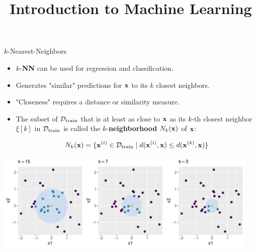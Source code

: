 \documentclass[11pt,compress,t,notes=noshow, xcolor=table]{beamer}
\title{Introduction to Machine Learning}
\institute{\href{https://compstat-lmu.github.io/lecture_i2ml/}{compstat-lmu.github.io/lecture\_i2ml}}
\date{}
\begin{document}

%



\begin{vbframe}{$k$-Nearest-Neighbors}

\begin{itemize}
\item $k$-\textbf{NN} can be used for regression and classification.
\item Generates "similar" predictions for $\xv$ to its $k$ closest neighbors.
\item "Closeness" requires a distance or similarity measure.
\item The subset of $\Dtrain$ that is at least as close to $\xv$ as its $k$-th closest neighbor $\xi[k]$ in $\Dtrain$ is called the $k$-\textbf{neighborhood} $N_k(\xv)$ of $\xv$:
\begin{footnotesize}
$$N_k(\xv) = \{ \xi \in \Dtrain \mid d(\xi, \xv) \leq d(\xi[k], \xv)\}$$
\end{footnotesize}
\end{itemize}


\begin{knitrout}\scriptsize
{}\color{fgcolor}

{\centering \includegraphics[width=0.95\textwidth]{figure/reg_knn_1}

}



\end{knitrout}

\end{vbframe}
\end{document}
